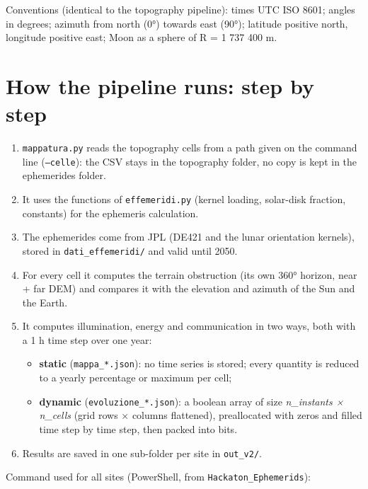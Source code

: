 \documentclass[11pt,a4paper]{article}
\providecommand{\tightlist}{\setlength{\itemsep}{0pt}\setlength{\parskip}{0pt}}
\begin{document}
Conventions (identical to the topography pipeline): times UTC ISO 8601;
angles in degrees; azimuth from north (0°) towards east (90°); latitude
positive north, longitude positive east; Moon as a sphere of R = 1 737
400 m.

\hypertarget{how-the-pipeline-runs-step-by-step}{%
\section{How the pipeline runs: step by
step}\label{how-the-pipeline-runs-step-by-step}}

\begin{enumerate}
\def\labelenumi{\arabic{enumi}.}
\tightlist
\item
  \texttt{mappatura.py} reads the topography cells from
  a path given on the command line (\texttt{--celle}):
  the CSV stays in the topography folder, no copy is kept in the
  ephemerides folder.
\item
  It uses the functions of \texttt{effemeridi.py}
  (kernel loading, solar-disk fraction, constants) for the ephemeris
  calculation.
\item
  The ephemerides come from JPL (DE421 and the lunar orientation
  kernels), stored in \texttt{dati\_effemeridi/} and
  valid until 2050.
\item
  For every cell it computes the terrain obstruction (its own 360°
  horizon, near + far DEM) and compares it with the elevation and
  azimuth of the Sun and the Earth.
\item
  It computes illumination, energy and communication in two ways, both
  with a 1 h time step over one year:

  \begin{itemize}
  \tightlist
  \item
    \textbf{static} (\texttt{mappa\_*.json}): no time
    series is stored; every quantity is reduced to a yearly percentage
    or maximum per cell;
  \item
    \textbf{dynamic} (\texttt{evoluzione\_*.json}): a
    boolean array of size \emph{n\_instants × n\_cells} (grid rows ×
    columns flattened), preallocated with zeros and filled time step by
    time step, then packed into bits.
  \end{itemize}
\item
  Results are saved in one sub-folder per site in
  \texttt{out\_v2/}.
\end{enumerate}

Command used for all sites (PowerShell, from
\texttt{Hackaton\_Ephemerids}):
\end{document}
